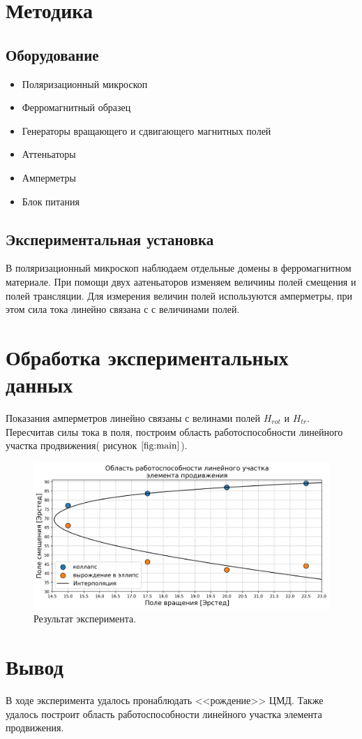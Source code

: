 \documentclass[a4paper, 14pt]{extarticle}
\begin{document}
\section*{\textcolor{header}{Методика}}
\subsection*{\textcolor{sub_header}{Оборудование}}

\begin{itemize}
    \item Поляризационный микроскоп
    \item Ферромагнитный образец
    \item Генераторы вращающего и сдвигающего магнитных полей
    \item Аттеньаторы
    \item Амперметры
    \item Блок питания
\end{itemize}

\subsection*{\textcolor{sub_header}{Экспериментальная установка}}


В поляризационный микроскоп наблюдаем отдельные домены в ферромагнитном материале.
При помощи двух аатеньаторов изменяем величины полей смещения и полей трансляции. 
Для измерения величин полей используются амперметры, при этом сила тока линейно связана с
с величинами полей.
\section*{\textcolor{header}{Обработка экспериментальных данных}}

Показания амперметров линейно связаны с велинами полей $H_{rot}$ и $H_{tr}$.
Пересчитав силы тока в поля, построим область работоспособности линейного участка 
продвижения( рисунок $\ref{fig:main}$).

\begin{figure}[htbp]
    \centering
    \includegraphics*[width = 1 \textwidth]{out.png}
    \caption{Результат эксперимента.}
    \label{fig:main}
\end{figure}


\section*{\textcolor{header}{Вывод}}

В ходе эксперимента удалось пронаблюдать <<рождение>> ЦМД. Также удалось 
построит область работоспособности линейного участка элемента продвижения.
\end{document}
